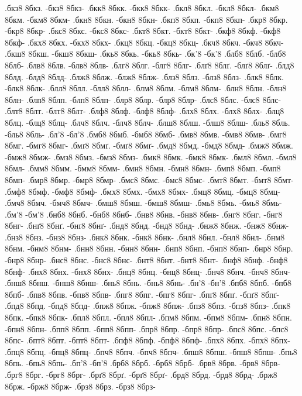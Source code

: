 {.бкз8 8бкз. -бкз8 8бкз-
.бкк8 8бкк. -бкк8 8бкк-
.бкл8 8бкл. -бкл8 8бкл-
.бкм8 8бкм. -бкм8 8бкм-
.бкн8 8бкн. -бкн8 8бкн-
.бкп8 8бкп. -бкп8 8бкп-
.бкр8 8бкр. -бкр8 8бкр-
.бкс8 8бкс. -бкс8 8бкс-
.бкт8 8бкт. -бкт8 8бкт-
.бкф8 8бкф. -бкф8 8бкф-
.бкх8 8бкх. -бкх8 8бкх-
.бкц8 8бкц. -бкц8 8бкц-
.бкч8 8бкч. -бкч8 8бкч-
.бкш8 8бкш. -бкш8 8бкш-
.бкь8 8бкь. -бкь8 8бкь-
.бк'8 -бк'8
.блб8 8блб. -блб8 8блб-
.блв8 8блв. -блв8 8блв-
.блг8 8блг. -блг8 8блг-
.блґ8 8блґ. -блґ8 8блґ-
.блд8 8блд. -блд8 8блд-
.блж8 8блж. -блж8 8блж-
.блз8 8блз. -блз8 8блз-
.блк8 8блк. -блк8 8блк-
.блл8 8блл. -блл8 8блл-
.блм8 8блм. -блм8 8блм-
.блн8 8блн. -блн8 8блн-
.блп8 8блп. -блп8 8блп-
.блр8 8блр. -блр8 8блр-
.блс8 8блс. -блс8 8блс-
.блт8 8блт. -блт8 8блт-
.блф8 8блф. -блф8 8блф-
.блх8 8блх. -блх8 8блх-
.блц8 8блц. -блц8 8блц-
.блч8 8блч. -блч8 8блч-
.блш8 8блш. -блш8 8блш-
.бль8 8бль. -бль8 8бль-
.бл'8 -бл'8
.бмб8 8бмб. -бмб8 8бмб-
.бмв8 8бмв. -бмв8 8бмв-
.бмг8 8бмг. -бмг8 8бмг-
.бмґ8 8бмґ. -бмґ8 8бмґ-
.бмд8 8бмд. -бмд8 8бмд-
.бмж8 8бмж. -бмж8 8бмж-
.бмз8 8бмз. -бмз8 8бмз-
.бмк8 8бмк. -бмк8 8бмк-
.бмл8 8бмл. -бмл8 8бмл-
.бмм8 8бмм. -бмм8 8бмм-
.бмн8 8бмн. -бмн8 8бмн-
.бмп8 8бмп. -бмп8 8бмп-
.бмр8 8бмр. -бмр8 8бмр-
.бмс8 8бмс. -бмс8 8бмс-
.бмт8 8бмт. -бмт8 8бмт-
.бмф8 8бмф. -бмф8 8бмф-
.бмх8 8бмх. -бмх8 8бмх-
.бмц8 8бмц. -бмц8 8бмц-
.бмч8 8бмч. -бмч8 8бмч-
.бмш8 8бмш. -бмш8 8бмш-
.бмь8 8бмь. -бмь8 8бмь-
.бм'8 -бм'8
.бнб8 8бнб. -бнб8 8бнб-
.бнв8 8бнв. -бнв8 8бнв-
.бнг8 8бнг. -бнг8 8бнг-
.бнґ8 8бнґ. -бнґ8 8бнґ-
.бнд8 8бнд. -бнд8 8бнд-
.бнж8 8бнж. -бнж8 8бнж-
.бнз8 8бнз. -бнз8 8бнз-
.бнк8 8бнк. -бнк8 8бнк-
.бнл8 8бнл. -бнл8 8бнл-
.бнм8 8бнм. -бнм8 8бнм-
.бнн8 8бнн. -бнн8 8бнн-
.бнп8 8бнп. -бнп8 8бнп-
.бнр8 8бнр. -бнр8 8бнр-
.бнс8 8бнс. -бнс8 8бнс-
.бнт8 8бнт. -бнт8 8бнт-
.бнф8 8бнф. -бнф8 8бнф-
.бнх8 8бнх. -бнх8 8бнх-
.бнц8 8бнц. -бнц8 8бнц-
.бнч8 8бнч. -бнч8 8бнч-
.бнш8 8бнш. -бнш8 8бнш-
.бнь8 8бнь. -бнь8 8бнь-
.бн'8 -бн'8
.бпб8 8бпб. -бпб8 8бпб-
.бпв8 8бпв. -бпв8 8бпв-
.бпг8 8бпг. -бпг8 8бпг-
.бпґ8 8бпґ. -бпґ8 8бпґ-
.бпд8 8бпд. -бпд8 8бпд-
.бпж8 8бпж. -бпж8 8бпж-
.бпз8 8бпз. -бпз8 8бпз-
.бпк8 8бпк. -бпк8 8бпк-
.бпл8 8бпл. -бпл8 8бпл-
.бпм8 8бпм. -бпм8 8бпм-
.бпн8 8бпн. -бпн8 8бпн-
.бпп8 8бпп. -бпп8 8бпп-
.бпр8 8бпр. -бпр8 8бпр-
.бпс8 8бпс. -бпс8 8бпс-
.бпт8 8бпт. -бпт8 8бпт-
.бпф8 8бпф. -бпф8 8бпф-
.бпх8 8бпх. -бпх8 8бпх-
.бпц8 8бпц. -бпц8 8бпц-
.бпч8 8бпч. -бпч8 8бпч-
.бпш8 8бпш. -бпш8 8бпш-
.бпь8 8бпь. -бпь8 8бпь-
.бп'8 -бп'8
.брб8 8брб. -брб8 8брб-
.брв8 8брв. -брв8 8брв-
.брг8 8брг. -брг8 8брг-
.брґ8 8брґ. -брґ8 8брґ-
.брд8 8брд. -брд8 8брд-
.брж8 8брж. -брж8 8брж-
.брз8 8брз. -брз8 8брз-
}
